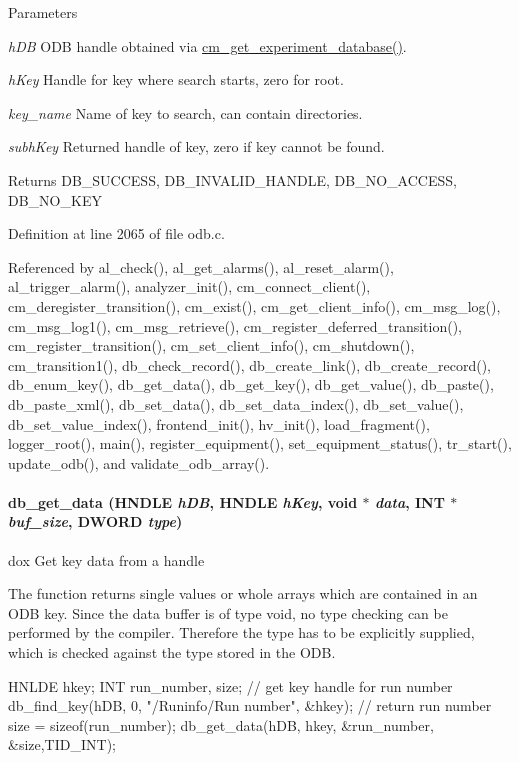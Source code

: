 \begin{DoxyParams}{Parameters}
\item[{\em hDB}]ODB handle obtained via \hyperlink{group__cmfunctionc_ga16b33b70783a3f5ba98b4094149d12b7}{cm\_\-get\_\-experiment\_\-database()}. \item[{\em hKey}]Handle for key where search starts, zero for root. \item[{\em key\_\-name}]Name of key to search, can contain directories. \item[{\em subhKey}]Returned handle of key, zero if key cannot be found. \end{DoxyParams}
\begin{DoxyReturn}{Returns}
DB\_\-SUCCESS, DB\_\-INVALID\_\-HANDLE, DB\_\-NO\_\-ACCESS, DB\_\-NO\_\-KEY 
\end{DoxyReturn}


Definition at line 2065 of file odb.c.

Referenced by al\_\-check(), al\_\-get\_\-alarms(), al\_\-reset\_\-alarm(), al\_\-trigger\_\-alarm(), analyzer\_\-init(), cm\_\-connect\_\-client(), cm\_\-deregister\_\-transition(), cm\_\-exist(), cm\_\-get\_\-client\_\-info(), cm\_\-msg\_\-log(), cm\_\-msg\_\-log1(), cm\_\-msg\_\-retrieve(), cm\_\-register\_\-deferred\_\-transition(), cm\_\-register\_\-transition(), cm\_\-set\_\-client\_\-info(), cm\_\-shutdown(), cm\_\-transition1(), db\_\-check\_\-record(), db\_\-create\_\-link(), db\_\-create\_\-record(), db\_\-enum\_\-key(), db\_\-get\_\-data(), db\_\-get\_\-key(), db\_\-get\_\-value(), db\_\-paste(), db\_\-paste\_\-xml(), db\_\-set\_\-data(), db\_\-set\_\-data\_\-index(), db\_\-set\_\-value(), db\_\-set\_\-value\_\-index(), frontend\_\-init(), hv\_\-init(), load\_\-fragment(), logger\_\-root(), main(), register\_\-equipment(), set\_\-equipment\_\-status(), tr\_\-start(), update\_\-odb(), and validate\_\-odb\_\-array().
\paragraph[{db\_\-get\_\-data}]{ db\_\-get\_\-data (HNDLE {\em hDB}, \/  HNDLE {\em hKey}, \/  void $\ast$ {\em data}, \/  {\bf INT} $\ast$ {\em buf\_\-size}, \/  {\bf DWORD} {\em type})}\hfill\label{group__odbfunctionc_ga8d8bb0ee338e5fbc46fed2c29e697540}
dox Get key data from a handle

The function returns single values or whole arrays which are contained in an ODB key. Since the data buffer is of type void, no type checking can be performed by the compiler. Therefore the type has to be explicitly supplied, which is checked against the type stored in the ODB. 
\begin{DoxyCode}
  HNLDE hkey;
  INT   run_number, size;
  // get key handle for run number
  db_find_key(hDB, 0, "/Runinfo/Run number", &hkey);
  // return run number
  size = sizeof(run_number);
  db_get_data(hDB, hkey, &run_number, &size,TID_INT);
\end{DoxyCode}
 
